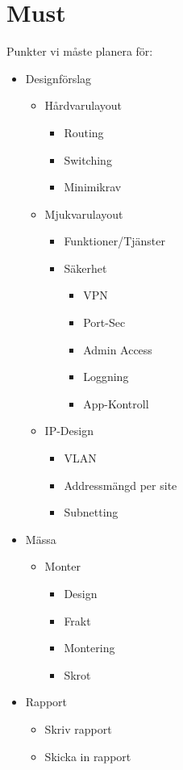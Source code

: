 \section*{Must}
Punkter vi måste planera för:

\begin{itemize}[noitemsep]
    \item Designförslag
    \begin{itemize}[noitemsep]
        \item Hårdvarulayout
        \begin{itemize}[noitemsep]
            \item Routing
            \item Switching
            \item Minimikrav
        \end{itemize}
        \item Mjukvarulayout
        \begin{itemize}[noitemsep]
            \item Funktioner/Tjänster
            \item Säkerhet
            \begin{itemize}[noitemsep]
                \item VPN
                \item Port-Sec
                \item Admin Access
                \item Loggning
                \item App-Kontroll
            \end{itemize}
        \end{itemize}
        \item IP-Design
        \begin{itemize}[noitemsep]
            \item VLAN
            \item Addressmängd per site
            \item Subnetting
        \end{itemize}
    \end{itemize}
    \item Mässa
    \begin{itemize}[noitemsep]
        \item Monter
        \begin{itemize}[noitemsep]
            \item Design
            \item Frakt
            \item Montering
            \item Skrot
        \end{itemize}
    \end{itemize}
    \item Rapport
    \begin{itemize}[noitemsep]
        \item Skriv rapport
        \item Skicka in rapport
    \end{itemize}
\end{itemize}


